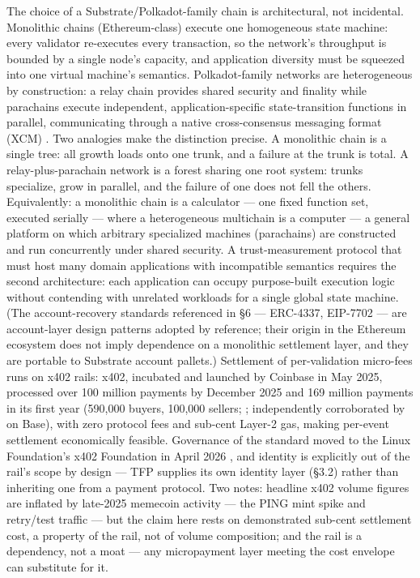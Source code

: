 \documentclass[11pt,twocolumn]{article}
\begin{document}
The choice of a Substrate/Polkadot-family chain is architectural, not
incidental. Monolithic chains (Ethereum-class) execute one homogeneous
state machine: every validator re-executes every transaction, so the
network's throughput is bounded by a single node's capacity, and
application diversity must be squeezed into one virtual machine's
semantics. Polkadot-family networks are heterogeneous by construction: a
relay chain provides shared security and finality while parachains
execute independent, application-specific state-transition functions in
parallel, communicating through a native cross-consensus messaging
format (XCM) \citep{polkadotdocs2026}. Two analogies make the
distinction precise. A monolithic chain is a single tree: all growth
loads onto one trunk, and a failure at the trunk is total. A
relay-plus-parachain network is a forest sharing one root system: trunks
specialize, grow in parallel, and the failure of one does not fell the
others. Equivalently: a monolithic chain is a calculator --- one fixed
function set, executed serially --- where a heterogeneous multichain is
a computer --- a general platform on which arbitrary specialized
machines (parachains) are constructed and run concurrently under shared
security. A trust-measurement protocol that must host many domain
applications with incompatible semantics requires the second
architecture: each application can occupy purpose-built execution logic
without contending with unrelated workloads for a single global state
machine. (The account-recovery standards referenced in §6 --- ERC-4337,
EIP-7702 --- are account-layer design patterns adopted by reference;
their origin in the Ethereum ecosystem does not imply dependence on a
monolithic settlement layer, and they are portable to Substrate account
pallets.) Settlement of per-validation micro-fees runs on x402 rails:
x402, incubated and launched by Coinbase in May 2025, processed over 100
million payments by December 2025 and 169 million payments in its first
year (590,000 buyers, 100,000 sellers; \citealp{coinbase2025};
independently corroborated by \citealp{chainalysis2026} on Base), with
zero protocol fees and sub-cent Layer-2 gas, making per-event settlement
economically feasible. Governance of the standard moved to the Linux
Foundation's x402 Foundation in April 2026 \citep{x402foundation2026},
and identity is explicitly out of the rail's scope by design --- TFP
supplies its own identity layer (§3.2) rather than inheriting one from a
payment protocol. Two notes: headline x402 volume figures are
inflated by late-2025 memecoin activity --- the PING mint spike and
retry/test traffic \citep{chainalysis2026} --- but the claim here rests
on demonstrated sub-cent settlement cost, a property of the rail, not of
volume composition; and the rail is a dependency, not a moat --- any
micropayment layer meeting the cost envelope can substitute for it.
\end{document}
